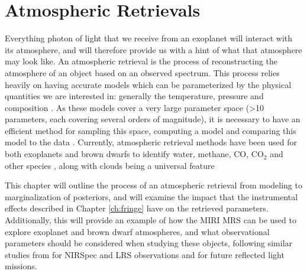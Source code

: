 \chapter{Atmospheric Retrievals}
Everything photon of light that we receive from an exoplanet will interact with its atmosphere, and will therefore provide us with a hint of what that atmosphere may look like.
An atmospheric retrieval is the process of reconstructing the atmosphere of an object based on an observed spectrum.
This process relies heavily on having accurate models which can be parameterized by the physical quantities we are interested in: generally the temperature, pressure and composition \parencite{Madhusudhan2018}.
As these models cover a very large parameter space (>10 parameters, each covering several orders of magnitude), it is necessary to have an efficient method for sampling this space, computing a model and comparing this model to the data 
\parencite{Benneke2012,Benneke2013}.
Currently, atmospheric retrieval methods have been used for both exoplanets and brown dwarfs to identify water, methane, CO, CO$_{2}$ and other species \parencite{Konopacky2013,Barman2015}, along with clouds being a universal feature \parencite{Line2017,Schlawin2018,Morley2018}

This chapter will outline the process of an atmospheric retrieval from modeling to marginalization of posteriors, and will examine the impact that the instrumental effects described in Chapter \ref{ch:fringe} have on the retrieved parameters. 
Additionally, this will provide an example of how the MIRI MRS can be used to explore exoplanet and brown dwarf atmospheres, and what observational parameters should be considered when studying these objects, following similar studies from \parencite{Batalha2018,Schlawin2018} for NIRSpec and LRS observations and \parencite{Feng2018} for future reflected light missions.





